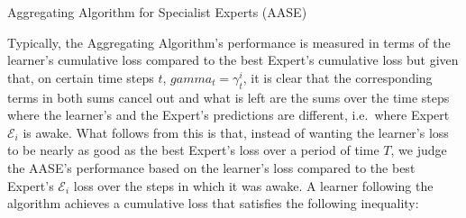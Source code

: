 \begin{algorithm}[ht]
    \caption{Aggregating Algorithm for Specialist Experts (AASE)}\label{algorithm:aggregating_algorithm_for_specialist_experts}
    \begin{algorithmic}[1]
    \end{algorithmic}
\end{algorithm}

Typically, the Aggregating Algorithm's performance is measured in terms of the learner's cumulative loss compared to the best Expert's cumulative loss but given that, on certain time steps $t$, $gamma_t = \gamma_t^i$, it is clear that the corresponding terms in both sums cancel out and what is left are the sums over the time steps where the learner's and the Expert's predictions are different, i.e.\ where Expert $\mathcal{E}_i$ is awake. What follows from this is that, instead of wanting the learner's loss to be nearly as good as the best Expert's loss over a period of time $T$, we judge the AASE's performance based on the learner's loss compared to the best Expert's $\mathcal{E}_i$ loss over the steps in which it was awake. A learner following the algorithm achieves a cumulative loss that satisfies the following inequality:

